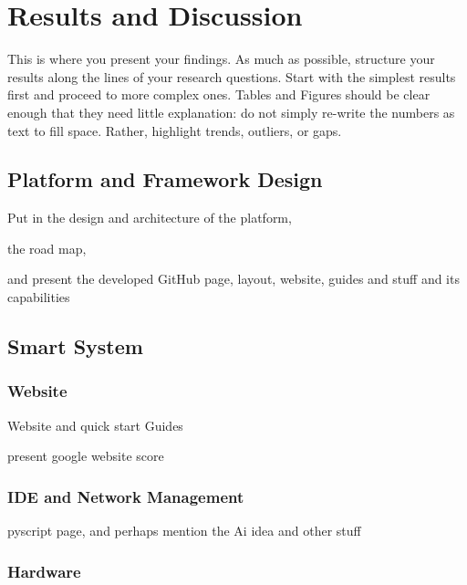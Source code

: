 \cleardoublepage%
\chapter{\label{chap:res}Results and Discussion}%

This is where you present your findings. As much as possible, structure your results along the lines of your research questions. Start with the simplest results first and proceed to more complex ones. Tables and Figures should be clear enough that they need little explanation: do not simply re-write the numbers as text to fill space. Rather, highlight trends, outliers, or gaps. 

\section{\label{sec:res_design}Platform and Framework Design} %


Put in the design and architecture of the platform,

the road map,

and present the developed GitHub page, layout, website, guides and stuff and its capabilities






\section{\label{sec:res_capabilities}Smart System} %

\subsection{\label{sec:res_website}Website}

Website and quick start Guides

present google website score

\subsection{\label{sec:res_ide}IDE and Network Management}

pyscript page, and perhaps mention the Ai idea and other stuff

\subsection{\label{sec:res_hardware}Hardware}

